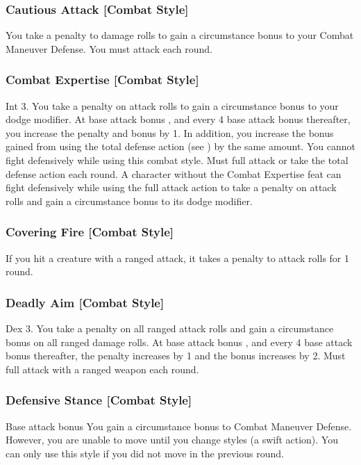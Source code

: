 \subsubsection{Cautious Attack [Combat Style]}
 You take a  penalty to damage rolls to gain a  circumstance bonus to your Combat Maneuver Defense. \babscalingdescription
{} You must attack each round.

\subsubsection{Combat Expertise [Combat Style]}
 Int 3.
 You take a  penalty on attack rolls to gain a  circumstance bonus to your dodge modifier. At base attack bonus , and every 4 base attack bonus thereafter, you increase the penalty and bonus by 1. In addition, you increase the bonus gained from using the total defense action (see ) by the same amount. You cannot fight defensively while using this combat style.
 Must full attack or take the total defense action each round.
 A character without the Combat Expertise feat can fight defensively while using the full attack action to take a  penalty on attack rolls and gain a  circumstance bonus to its dodge modifier.

\subsubsection{Covering Fire [Combat Style]}
 If you hit a creature with a ranged attack, it takes a  penalty to attack rolls for 1 round.

\subsubsection{Deadly Aim [Combat Style]}
 Dex 3.
 You take a  penalty on all ranged attack rolls and gain a  circumstance bonus on all ranged damage rolls. At base attack bonus , and every 4 base attack bonus thereafter, the penalty increases by 1 and the bonus increases by 2.
 Must full attack with a ranged weapon each round.

\subsubsection{Defensive Stance [Combat Style]}
 Base attack bonus 
 You gain a  circumstance bonus to Combat Maneuver Defense. \babscalingdescription However, you are unable to move until you change styles (a swift action). You can only use this style if you did not move in the previous round.

